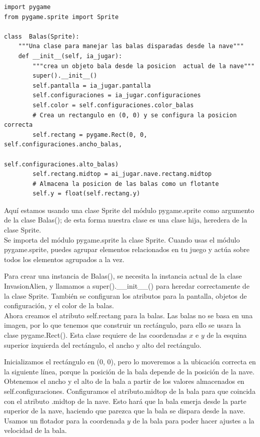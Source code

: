 \hspace{-2.3cm}{\ttfamily \scriptsize  balas.py} \vspace{-0.5cm}
\begin{lstlisting}		
import pygame
from pygame.sprite import Sprite

class  Balas(Sprite):
    """Una clase para manejar las balas disparadas desde la nave"""
    def __init__(self, ia_jugar):
        """crea un objeto bala desde la posicion  actual de la nave"""
        super().__init__()
        self.pantalla = ia_jugar.pantalla
        self.configuraciones = ia_jugar.configuraciones
        self.color = self.configuraciones.color_balas
        # Crea un rectangulo en (0, 0) y se configura la posicion correcta
        self.rectang = pygame.Rect(0, 0, self.configuraciones.ancho_balas,
                                         self.configuraciones.alto_balas)
        self.rectang.midtop = ai_jugar.nave.rectang.midtop
        # Almacena la posicion de las balas como un flotante
        self.y = float(self.rectang.y)
\end{lstlisting}
Aquí estamos usando una clase {\ttfamily Sprite} del módulo {\ttfamily pygame.sprite}  como argumento  de la clase {\ttfamily Balas()}; de esta forma nuestra clase es una clase hija,  heredera de la clase  {\ttfamily Sprite}.\\ 

Se importa del módulo  {\ttfamily pygame.sprite} la clase {\ttfamily Sprite}.  Cuando usas  el módulo {\ttfamily pygame.sprite}, puedes agrupar elementos relacionados en tu juego y actúa sobre todos los elementos agrupados a la vez.
 
Para crear una instancia de {\ttfamily Balas()}, se necesita la instancia actual de la clase {\ttfamily InvasionAlien}, y llamamos
a {\ttfamily super().\_\_init\_\_()} para heredar correctamente de la clase {\ttfamily Sprite}.  También se configuran los 
atributos para la pantalla, objetos de configuración, y  el color de la balas.\\


Ahora creamos el atributo {\ttfamily self.rectang}  para la balas. Las balas no se basa en una imagen, por lo que tenemos que 
construir un rectángulo, para ello se usara la clase {\ttfamily pygame.Rect()}. Esta clase requiere de las coordenadas
$x$ e $y$ de la esquina superior izquierda del rectángulo, el ancho y alto del rectángulo. 

Inicializamos el rectángulo en (0, 0), pero lo moveremos a la ubicación correcta en la siguiente línea, porque 
la posición de la bala depende de la posición de la nave. Obtenemos el ancho y el alto de la bala a partir de los valores almacenados en {\ttfamily self.configuraciones}. Configuramos el atributo{\ttfamily  .midtop} de la bala para que coincida con el atributo 
{\ttfamily .midtop} de la nave. Esto hará que la bala emerja desde la parte superior de la nave, haciendo que parezca que la bala se dispara desde la nave. Usamos un flotador para la coordenada $y$ de la bala para poder hacer ajustes a la velocidad de la bala.

